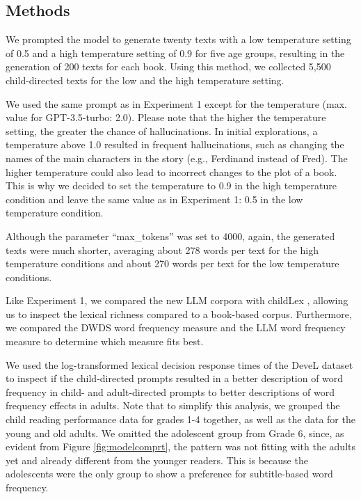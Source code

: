 \documentclass[doc, a4paper]{apa7}
\begin{document}
\subsection{Methods}

We prompted the model to generate twenty texts with a low temperature setting of 0.5 and a high temperature setting of 0.9 for five age groups, resulting in the generation of 200 texts for each book. Using this method, we collected 5,500 child-directed texts for the low and the high temperature setting. 

We used the same prompt as in Experiment 1 except for the temperature (max. value for GPT-3.5-turbo: 2.0). Please note that the higher the temperature setting, the greater the chance of hallucinations. In initial explorations, a temperature above 1.0 resulted in frequent hallucinations, such as changing the names of the main characters in the story (e.g., Ferdinand instead of Fred). The higher temperature could also lead to incorrect changes to the plot of a book. This is why we decided to set the temperature to 0.9 in the high temperature condition and leave the same value as in Experiment 1: 0.5 in the low temperature condition. 

Although the parameter “max\_tokens” was set to 4000, again, the generated texts were much shorter, averaging about 278 words per text for the high temperature conditions and about 270 words per text for the low temperature conditions. 

Like Experiment 1, we compared the new LLM corpora with childLex \cite{schroeder_childlex_2015}, allowing us to inspect the lexical richness compared to a book-based corpus. Furthermore, we compared the DWDS word frequency measure and the LLM word frequency measure to determine which measure fits best. 

We used the log-transformed lexical decision response times of the DeveL dataset to inspect if the child-directed prompts resulted in a better description of word frequency in child- and adult-directed prompts to better descriptions of word frequency effects in adults. Note that to simplify this analysis, we grouped the child reading performance data for grades 1-4 together, as well as the data for the young and old adults. We omitted the adolescent group from Grade 6, since, as evident from Figure \ref{fig:modelcomprt}, the pattern was not fitting with the adults yet and already different from the younger readers. This is because the adolescents were the only group to show a preference for subtitle-based word frequency. 
\end{document}

